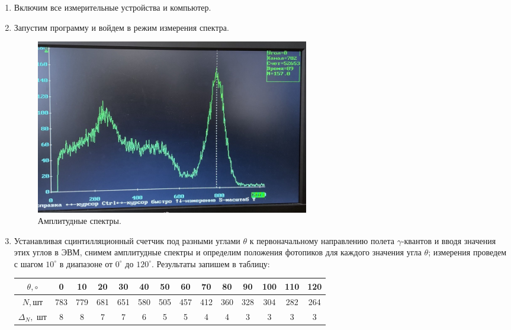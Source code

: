 \documentclass[a4paper,12pt]{article}
\begin{document}
 \begin{enumerate}
		\item Включим все измерительные устройства и компьютер.
		
		\item Запустим программу и войдем в режим измерения спектра.
		
		    \begin{figure}[H]
  \begin{center}
    \includegraphics[width=12cm]{ex2.jpg}
    \caption{Амплитудные спектры.}
    \label{fig:}
  \end{center}
\end{figure}

		\item Устанавливая сцинтилляционный счетчик под разными углами $\theta$ к первоначальному направлению полета $\gamma$-квантов и вводя значения этих углов в ЭВМ, снимем амплитудные спектры и определим положения фотопиков для каждого значения угла $\theta$; измерения проведем с шагом $10^\circ$ в диапазоне от $0^\circ$ до $120^\circ$. Результаты запишем в таблицу:
		
  \begin{table}[H]
\begin{center}
\begin{tabular}{|c|c|c|c|c|c|c|c|c|c|c|c|c|c|}
\hline $\theta, \circ$&0&10&20&30&40&50&60&70&80&90&100&110&120\\
\hline $N ,$шт&783&779&681&651&580&505&457&412&360&328&304&282&264\\
\hline $\Delta_N, $ шт&8&8&7&7&6&5&5&4&4&3&3&3&3\\
\hline
\end{tabular}
\end{center}
\end{table}


\end{enumerate}
\end{document}
